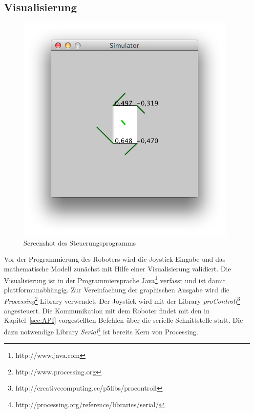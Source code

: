 \subsection{Visualisierung}
\begin{figure}
\centering
    \includegraphics[width=.6\textwidth]{Abbildungen/Visualisierung}
    \caption[Visualisierung]{Screenshot des Steuerungsprogramms}
    \label{fig:Visualisierung}
\end{figure}
Vor der Programmierung des Roboters wird die Joystick-Eingabe und das mathematische Modell zunächst mit Hilfe einer Visualisierung validiert.
Die Visualisierung ist in der Programmiersprache Java\footnote{http://www.java.com} verfasst und ist damit plattformunabhängig.
Zur Vereinfachung der graphischen Ausgabe wird die \emph{Processing}\footnote{http://www.processing.org}-Library verwendet.
Der Joystick wird mit der Library \emph{proControll}\footnote{http://creativecomputing.cc/p5libs/procontroll} angesteuert.
Die Kommunikation mit dem Roboter findet mit den in Kapitel~\ref{sec:API} vorgestellten Befehlen über die serielle Schnittstelle statt. Die dazu notwendige Library \emph{Serial}\footnote{http://processing.org/reference/libraries/serial/} ist bereits Kern von Processing.
